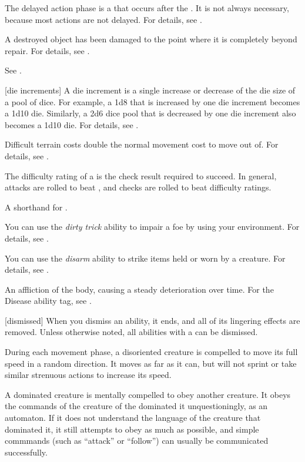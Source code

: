  The delayed action phase is a  that occurs after the .
It is not always necessary, because most actions are not delayed.
For details, see .

 A destroyed object has been damaged to the point where it is completely beyond repair.
For details, see .

 See .

[die increments] A die increment is a single increase or decrease of the die size of a pool of dice.
For example, a 1d8 that is increased by one die increment becomes a 1d10 die.
Similarly, a 2d6 dice pool that is decreased by one die increment also becomes a 1d10 die.
For details, see .

 Difficult terrain costs double the normal movement cost to move out of.
For details, see .

 The difficulty rating of a  is the check result required to succeed.
In general, attacks are rolled to beat , and checks are rolled to beat difficulty ratings.

 A shorthand for .

 You can use the \textit{dirty trick} ability to impair a foe by using your environment.
For details, see .

 You can use the \textit{disarm} ability to strike items held or worn by a creature.
For details, see .

 An affliction of the body, causing a steady deterioration over time. For the Disease ability tag, see .

[dismissed] When you dismiss an ability, it ends, and all of its lingering effects are removed.
Unless otherwise noted, all abilities with a  can be dismissed.

 During each movement phase, a disoriented creature is compelled to move its full speed in a random direction.
It moves as far as it can, but will not sprint or take similar strenuous actions to increase its speed.

 A dominated creature is mentally compelled to obey another creature.
It obeys the commands of the creature of the dominated it unquestioningly, as an automaton.
If it does not understand the language of the creature that dominated it, it still attempts to obey as much as possible, and simple commmands (such as ``attack'' or ``follow'') can usually be communicated successfully.

